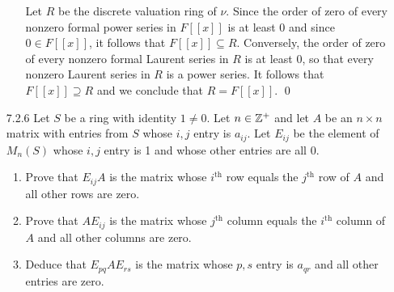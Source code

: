\begin{enumerate}
\begin{enumerate}
               Let $R$ be the discrete valuation ring of $\nu$. Since the order
               of zero of every nonzero formal power series in $F[[x]]$ is at
               least 0 and since $0 \in F[[x]]$, it follows that
               $F[[x]] \subseteq R$. Conversely, the order of zero of every
               nonzero formal Laurent series in $R$ is at least 0, so that every
               nonzero Laurent series in $R$ is a power series. It follows that
               $F[[x]] \supseteq R$ and we conclude that $R = F[[x]]$. \qed
      \end{enumerate}
   \item[7.2.6]   Let $S$ be a ring with identity $1 \neq 0$. Let $n \in \mathbb{Z}^+$ 
                  and let $A$ be an $n \times n$ matrix with entries from $S$
                  whose $i, j$ entry is $a_{ij}$. Let $E_{ij}$ be the element of
                  $M_n(S)$ whose $i, j$ entry is 1 and whose other entries are
                  all 0.
                  \begin{enumerate}
                     \item Prove that $E_{ij}A$ is the matrix whose
                           $i^{\text{th}}$ row equals the $j^{\text{th}}$ row of
                           $A$ and all other rows are zero.
                     \item Prove that $AE_{ij}$ is the matrix whose
                           $j^{\text{th}}$ column equals the $i^{\text{th}}$
                           column of $A$ and all other columns are zero.
                     \item Deduce that $E_{pq}AE_{rs}$ is the matrix whose
                           $p, s$ entry is $a_{qr}$ and all other entries are
                           zero.
                  \end{enumerate}


\end{enumerate}
